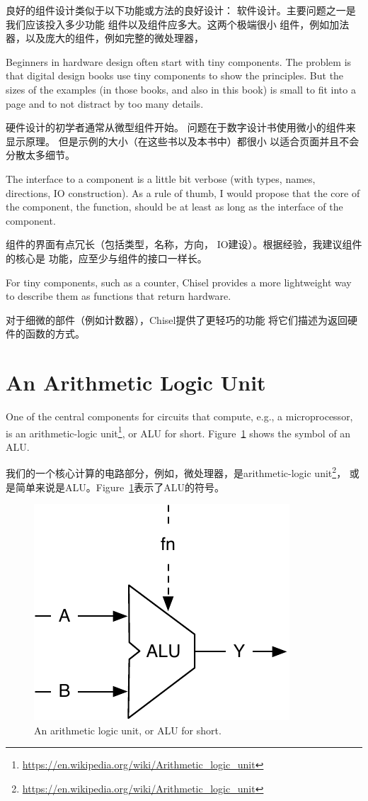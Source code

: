 \documentclass[%
    10pt,
    headinclude, footexclude,
    openright, %
    notitlepage,
    cleardoubleempty,
    headsepline,
    pointlessnumbers,
    bibtotoc, idxtotoc,
    ]{scrbook}
\newcommand{\scale}{0.7}
\newcommand{\myref}[2]{\href{#1}{#2}}
\renewcommand{\myref}[2]{{#2}{\footnote{\url{#1}}}}
\begin{document}
良好的组件设计类似于以下功能或方法的良好设计：
软件设计。主要问题之一是我们应该投入多少功能
组件以及组件应多大。这两个极端很小
组件，例如加法器，以及庞大的组件，例如完整的微处理器，

Beginners in hardware design often start with tiny components.
The problem is that digital design books use tiny components to show the principles.
But the sizes of the examples (in those books, and also in this book) is small
to fit into a page and to not distract by too many details.

硬件设计的初学者通常从微型组件开始。
问题在于数字设计书使用微小的组件来显示原理。
但是示例的大小（在这些书以及本书中）都很小
以适合页面并且不会分散太多细节。

The interface to a component is a little bit verbose (with types, names, directions,
IO construction). As a rule of thumb, I would propose that the core of the component,
the function, should be at least as long as the interface of the component.


组件的界面有点冗长（包括类型，名称，方向，
IO建设）。根据经验，我建议组件的核心是
功能，应至少与组件的接口一样长。

For tiny components, such as a counter, Chisel provides a more lightweight
way to describe them as functions that return hardware.


对于细微的部件（例如计数器），Chisel提供了更轻巧的功能
将它们描述为返回硬件的函数的方式。


\section{An Arithmetic Logic Unit}

One of the central components for circuits that compute, e.g., a microprocessor, is an
\myref{https://en.wikipedia.org/wiki/Arithmetic_logic_unit}{arithmetic-logic unit},
or ALU for short. Figure~\ref{fig:alu} shows the symbol of an ALU.

我们的一个核心计算的电路部分，例如，微处理器，是\myref{https://en.wikipedia.org/wiki/Arithmetic_logic_unit}{arithmetic-logic unit}，
或是简单来说是ALU。Figure~\ref{fig:alu}表示了ALU的符号。

\begin{figure}
  \centering
  \includegraphics[scale=\scale]{figures/alu}
  \caption{An arithmetic logic unit, or ALU for short.}
  \label{fig:alu}
\end{figure}
\end{document}
